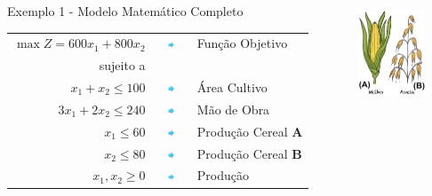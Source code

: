 \begin{frame}
	{
		\begin{columns}
			\begin{column}{0.7\textwidth}
				\centering
				\begin{exampleblock}{Exemplo 1 - Modelo Matemático Completo}
					\scriptsize
					\begin{table}
						\begin{tabular}{r c l}
							$ \max Z = 600x_1+800x_2$ & \includegraphics[width=0.8cm,height=0.2cm]{seta2.png} & Função Objetivo \\
							sujeito a & & \\
							$x_1+x_2 \le 100$ & \includegraphics[width=0.8cm,height=0.2cm]{seta2.png}& Área Cultivo \\
							$3x_1+2x_2 \le 240$ & \includegraphics[width=0.8cm,height=0.2cm]{seta2.png}& Mão de Obra \\
							$x_1 \le 60 $ & \includegraphics[width=0.8cm,height=0.2cm]{seta2.png}& Produção Cereal \textbf{A} \\
							$x_2 \le 80 $ &\includegraphics[width=0.8cm,height=0.2cm]{seta2.png} & Produção Cereal \textbf{B} \\
							$x_1, x_2 \ge 0$ & \includegraphics[width=0.8cm,height=0.2cm]{seta2.png}& Produção \\
						\end{tabular}
					\end{table}
				\end{exampleblock}
			\end{column}
			\begin{column}{0.3\textwidth}
				\centering
				\includegraphics[width=2cm,height=3cm]{milho_aveia2.png}
			\end{column}
		\end{columns}
	}


\end{frame}
